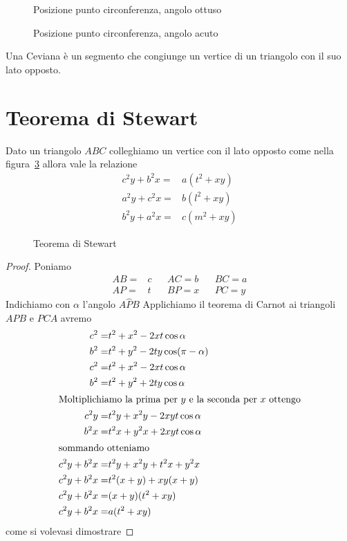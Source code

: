 \begin{figure}
	\centering
	
	\caption{Posizione punto circonferenza, angolo ottuso}
	\label{fig:circonferenza2}
\end{figure}
\begin{figure}
	\centering
	
	\caption{Posizione punto circonferenza, angolo acuto}
	\label{fig:circonferenza3}
\end{figure}
\begin{defn}[Ceviana]\label{defn:ceviana1}
Una Ceviana è un segmento che congiunge un vertice di un triangolo con il suo lato opposto.
\end{defn}
\section{Teorema di Stewart}\label{sec:teorema-di-stewart}
\begin{thm}\label{thm:Stewart}
Dato un triangolo $ABC$ colleghiamo un vertice con il lato opposto come nella figura~\cref{fig:stewart1} allora vale la relazione 
\begin{align*}
c^2y+b^2x=&a(t^2+xy)\\     
a^2y+c^2x=&b(l^2+xy)\\        
b^2y+a^2x=&c(m^2+xy)
\end{align*}
\end{thm}
\begin{figure}
	\centering
	
	\caption{Teorema di Stewart}
	\label{fig:stewart1}
\end{figure}
\begin{proof}
Poniamo
\begin{align*}
AB=&c&&AC=b&&BC=a\\
AP=&t&&BP=x&&PC=y
\end{align*}
Indichiamo con $\alpha$ l'angolo $A\hat{P}B$ Applichiamo il teorema di Carnot ai triangoli $APB$ e $PCA$ avremo 
\begin{align*}
c^2=&t^2+x^2-2xt\cos\alpha\\
b^2=&t^2+y^2-2ty\cos(\pi-\alpha)\\
c^2=&t^2+x^2-2xt\cos\alpha\\
b^2=&t^2+y^2+2ty\cos\alpha\\
\intertext{Moltiplichiamo la prima per $y$ e la seconda per $x$ ottengo}
c^2y=&t^2y+x^2y-2xyt\cos\alpha\\
b^2x=&t^2x+y^2x+2xyt\cos\alpha\\
\intertext{sommando otteniamo}
c^2y+b^2x=&t^2y+x^2y+t^2x+y^2x\\
c^2y+b^2x=&t^2(x+y)+xy(x+y)\\
c^2y+b^2x=&(x+y)(t^2+xy)\\
c^2y+b^2x=&a(t^2+xy)\\
\end{align*}
come si volevasi dimostrare
\end{proof}
